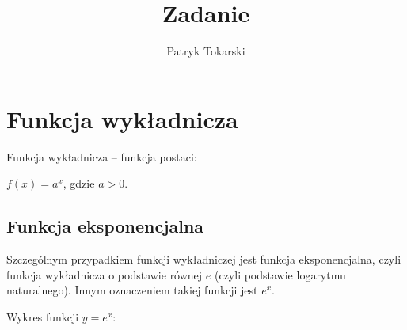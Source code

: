 \documentclass[10pt,a4paper,onecolumn]{article}
\author{Patryk Tokarski}
\title{Zadanie }
\begin{document}
\section{Funkcja wykładnicza}
Funkcja wykładnicza – funkcja postaci:

    $f(x)=a^{x}$, gdzie $a>0$.


\subsection{Funkcja eksponencjalna\cite{Wykladnicza}}
Szczególnym przypadkiem funkcji wykładniczej jest funkcja eksponencjalna, czyli funkcja wykładnicza o podstawie równej $e$ (czyli podstawie logarytmu naturalnego). Innym oznaczeniem takiej funkcji jest $e^x$.

Wykres funkcji $y=e^{x}{:}$
\end{document}
